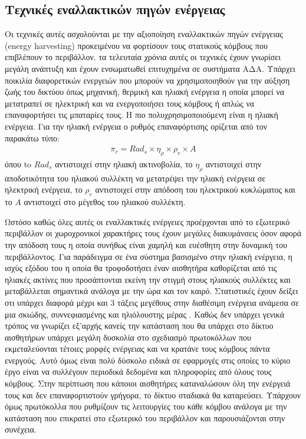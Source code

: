 \subsection{Τεχνικές εναλλακτικών πηγών ενέργειας}
Οι τεχνικές αυτές ασχολούνται με την αξιοποίηση εναλλακτικών πηγών ενέργειας (energy harvesting) προκειμένου να φορτίσουν τους στατικούς κόμβους που επιβλέπουν το
περιβάλλον. τα τελευταία χρόνια αυτές οι τεχνικές έχουν γνωρίσει μεγάλη ανάπτυξη και έχουν ενσωματωθεί επιτυχημένα σε συστήματα ΑΔΑ. Υπάρχει ποικιλία διαφορετικών
ενεργειών που μπορούν να χρησιμοποιηθούν για την αύξηση ζωής του δικτύου όπως μηχανική, θερμική και ηλιακή ενέργεια η οποία μπορεί να μετατραπεί σε ηλεκτρική και να
ενεργοποιήσει τους κόμβους ή απλώς να επαναφορτήσει τις μπαταρίες τους. Η πιο πολυχρησιμοποιούμενη είναι η ηλιακή ενέργεια. Για την ηλιακή ενέργεια ο ρυθμός
επαναφόρτισης ορίζεται από τον παρακάτω τύπο:
\begin{align*}
\pi_{r} = Rad_{s} \times \eta_{\rho} \times \rho_{e} \times A
\end{align*}
όπου to $Rad_{s}$ αντιστοιχεί στην ηλιακή ακτινοβολία, το $\eta_{\rho}$ αντιστοιχεί στην αποδοτικότητα του ηλιακού συλλέκτη να μετατρέψει την ηλιακή ενέργεια σε
ηλεκτρική ενέργεια, το $\rho_{e}$ αντιστοιχεί στην απόδοση του ηλεκτρικού κυκλώματος και το $A$ αντιστοιχεί στο μέγεθος του ηλιακού συλλέκτη.

Ωστόσο καθώς όλες αυτές οι εναλλακτικές ενέργειες προέρχονται από το εξωτερικό περιβάλλον οι χωροχρονικοί χαρακτήρες τους έχουν μεγάλες διακυμάνσεις όσον αφορά την
απόδοση τους η οποία συνήθως είναι χαμηλή και ευέσθητη στην δυναμική του περιβάλλοντος. Για παράδειγμα σε ένα σύστημα βασισμένο στην ηλιακή ενέργεια, η ισχύς εξόδου
του η οποία θα τροφοδοτήσει έναν αισθητήρα καθορίζεται από τις ηλιακές ακτίνες που προσάπτονται εκείνη την στιγμή στους ηλιακούς συλλέκτες και μεταβάλλεται σημαντικά
ανάλογα με την ώρα και τον καιρό. Στατιστικές έχουν δείξει οτι υπάρχει διαφορά μέχρι και 3 τάξεις μεγέθους στην διαθέσιμη ενέργεια ανάμεσα σε μια σκιώδης,
συννεφιασμένης και ηλιόλουστης μέρας \cite{harvesting_comparison}. Καθώς δεν υπάρχει γενικά τρόπος να γνωρίζει εξ'αρχής κανείς την κατάσταση που θα υπάρχει στο δίκτυο
αισθητήρων υπάρχει μεγάλη δυσκολία στο σχεδιασμό πρωτοκόλλων που εκμεταλεύονται τέτοιες μορφές ενέργειας και να κρατάνε τους κόμβους πάντα ενεργούς. Αυτό όμως είναι
πολύ δύσκολο ειδικά σε εφαρμογές στις οποίες το κύριο έργο είναι να συλλέγουν περιοδικά δεδομένα και πληροφορίες από όλους τους κόμβους. Στην περίπτωση που κάποιοι
αισθητήρες καταναλώσουν όλη την ενέργειά τους και δεν επαναφορτιστούν γρήγορα, το δίκτυο σταδιακά θα καταρεύσει. Υπάρχουν όμως πρωτόκολλα που ρυθμίζουν τις
λειτουργίες του κάθε κόμβου ανάλογα με την κατάσταση που επικρατεί στο εξωτερικό του περιβάλλον και παρουσιάζονται στην συνέχεια.

